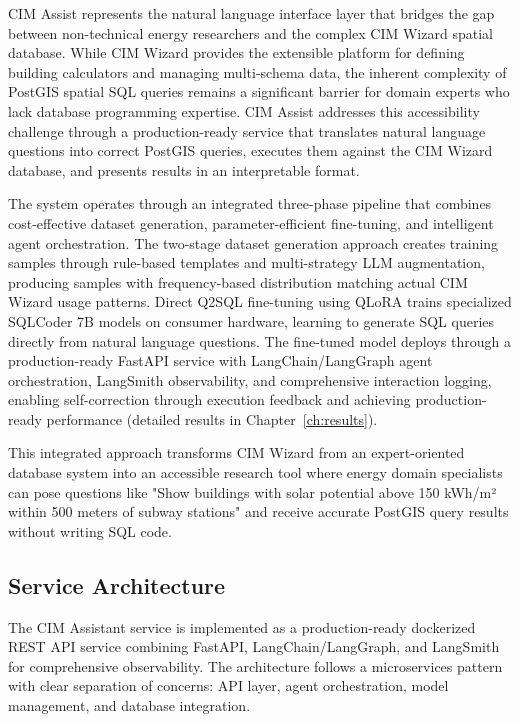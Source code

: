 CIM Assist represents the natural language interface layer that bridges the gap between non-technical energy researchers and the complex CIM Wizard spatial database. While CIM Wizard provides the extensible platform for defining building calculators and managing multi-schema data, the inherent complexity of PostGIS spatial SQL queries remains a significant barrier for domain experts who lack database programming expertise. CIM Assist addresses this accessibility challenge through a production-ready service that translates natural language questions into correct PostGIS queries, executes them against the CIM Wizard database, and presents results in an interpretable format.

The system operates through an integrated three-phase pipeline that combines cost-effective dataset generation, parameter-efficient fine-tuning, and intelligent agent orchestration. The two-stage dataset generation approach creates training samples through rule-based templates and multi-strategy LLM augmentation, producing samples with frequency-based distribution matching actual CIM Wizard usage patterns. Direct Q2SQL fine-tuning using QLoRA trains specialized SQLCoder 7B models on consumer hardware, learning to generate SQL queries directly from natural language questions. The fine-tuned model deploys through a production-ready FastAPI service with LangChain/LangGraph agent orchestration, LangSmith observability, and comprehensive interaction logging, enabling self-correction through execution feedback and achieving production-ready performance (detailed results in Chapter~\ref{ch:results}).

This integrated approach transforms CIM Wizard from an expert-oriented database system into an accessible research tool where energy domain specialists can pose questions like "Show buildings with solar potential above 150 kWh/m² within 500 meters of subway stations" and receive accurate PostGIS query results without writing SQL code.

\subsection{Service Architecture}

The CIM Assistant service is implemented as a production-ready dockerized REST API service combining FastAPI, LangChain/LangGraph, and LangSmith for comprehensive observability. The architecture follows a microservices pattern with clear separation of concerns: API layer, agent orchestration, model management, and database integration.


